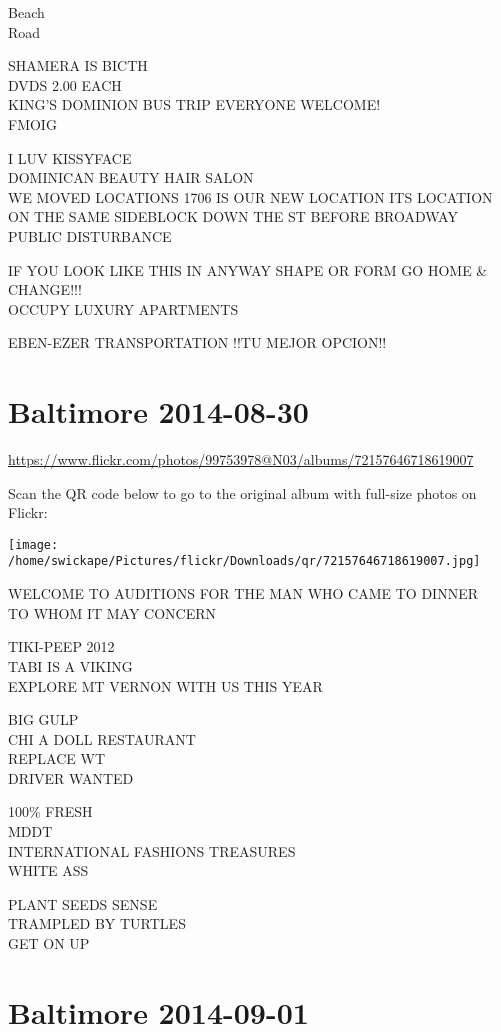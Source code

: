 \documentclass[10pt,letterpaper]{article}
\begin{document}
Beach\\
Road

SHAMERA IS BICTH\\
DVDS 2.00 EACH\\
KING'S DOMINION BUS TRIP EVERYONE WELCOME!\\
FMOIG

I LUV KISSYFACE\\
DOMINICAN BEAUTY HAIR SALON\\
WE MOVED LOCATIONS 1706 IS OUR NEW LOCATION ITS LOCATION ON THE SAME SIDEBLOCK DOWN THE ST BEFORE BROADWAY\\
PUBLIC DISTURBANCE

IF YOU LOOK LIKE THIS IN ANYWAY SHAPE OR FORM GO HOME \& CHANGE!!!\\
OCCUPY LUXURY APARTMENTS

EBEN{-}EZER TRANSPORTATION  !!TU MEJOR OPCION!!


\section*{Baltimore 2014-08-30}

\url{https://www.flickr.com/photos/99753978@N03/albums/72157646718619007}

Scan the QR code below to go to the original album with full-size photos on Flickr:

\texttt{[image: /home/swickape/Pictures/flickr/Downloads/qr/72157646718619007.jpg]}


WELCOME TO AUDITIONS FOR THE MAN WHO CAME TO DINNER\\
TO WHOM IT MAY CONCERN

TIKI{-}PEEP 2012\\
TABI IS A VIKING\\
EXPLORE MT VERNON WITH US THIS YEAR

BIG GULP\\
CHI A DOLL RESTAURANT\\
REPLACE WT\\
DRIVER WANTED

100\% FRESH\\
MDDT\\
INTERNATIONAL FASHIONS TREASURES\\
WHITE ASS

PLANT SEEDS SENSE\\
TRAMPLED BY TURTLES\\
GET ON UP


\section*{Baltimore 2014-09-01}
\end{document}
